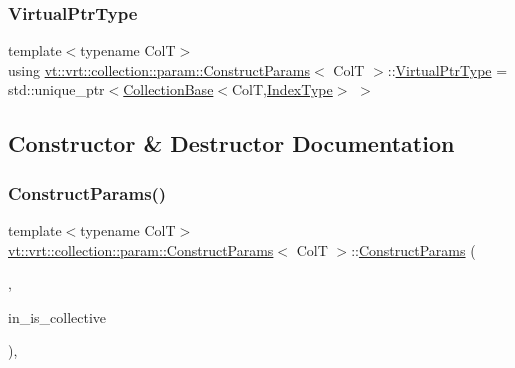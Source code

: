 \subsubsection{\texorpdfstring{Virtual\+Ptr\+Type}{VirtualPtrType}}
{\footnotesize\ttfamily template$<$typename ColT$>$ \\
using \hyperlink{structvt_1_1vrt_1_1collection_1_1param_1_1_construct_params}{vt\+::vrt\+::collection\+::param\+::\+Construct\+Params}$<$ ColT $>$\+::\hyperlink{structvt_1_1vrt_1_1collection_1_1param_1_1_construct_params_a51c2b552a29b508b728b2e903d6073b1}{Virtual\+Ptr\+Type} =  std\+::unique\+\_\+ptr$<$\hyperlink{structvt_1_1vrt_1_1collection_1_1_collection_base}{Collection\+Base}$<$ColT,\hyperlink{structvt_1_1vrt_1_1collection_1_1param_1_1_construct_params_a7bc8d5d57e377e0f2e60031582eeb7e6}{Index\+Type}$>$ $>$}



\subsection{Constructor \& Destructor Documentation}
\mbox{\label{structvt_1_1vrt_1_1collection_1_1param_1_1_construct_params_a41900d135214f06c2d2b4e7c9d9ae1aa}} 
\subsubsection{\texorpdfstring{Construct\+Params()}{ConstructParams()}\hspace{0.1cm}{\footnotesize\ttfamily [1/4]}}
{\footnotesize\ttfamily template$<$typename ColT$>$ \\
\hyperlink{structvt_1_1vrt_1_1collection_1_1param_1_1_construct_params}{vt\+::vrt\+::collection\+::param\+::\+Construct\+Params}$<$ ColT $>$\+::\hyperlink{structvt_1_1vrt_1_1collection_1_1param_1_1_construct_params}{Construct\+Params} (\begin{DoxyParamCaption}\item[{\hyperlink{structvt_1_1vrt_1_1collection_1_1param_1_1_construct_params_1_1_builder_tag}{Builder\+Tag}}]{,  }\item[{bool const}]{in\+\_\+is\+\_\+collective }\end{DoxyParamCaption})\hspace{0.3cm}{\ttfamily [inline]}, {\ttfamily [private]}}

